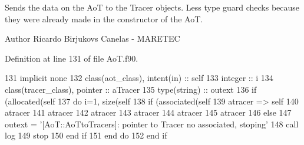 Sends the data on the AoT to the Tracer objects. Less type guard checks because they were already made in the constructor of the AoT. 

\begin{DoxyAuthor}{Author}
Ricardo Birjukovs Canelas -\/ M\+A\+R\+E\+T\+EC 
\end{DoxyAuthor}


Definition at line 131 of file Ao\+T.\+f90.


\begin{DoxyCode}
131     \textcolor{keywordtype}{implicit none}
132     \textcolor{keywordtype}{class}(aot\_class), \textcolor{keywordtype}{intent(in)} :: self
133     \textcolor{keywordtype}{integer} :: i
134     \textcolor{keywordtype}{class}(tracer\_class), \textcolor{keywordtype}{pointer} :: aTracer
135     \textcolor{keywordtype}{type}(string) :: outext
136     \textcolor{keywordflow}{if} (\textcolor{keyword}{allocated}(self%
137         \textcolor{keywordflow}{do} i=1, \textcolor{keyword}{size}(self%
138             \textcolor{keywordflow}{if} (\textcolor{keyword}{associated}(self%
139                 atracer => self%
140                 atracer%
141                 atracer%
142                 atracer%
143                 atracer%
144                 atracer%
145                 atracer%
146             \textcolor{keywordflow}{else}
147                 outext = \textcolor{stringliteral}{'[AoT::AoTtoTracers]: pointer to Tracer no associated, stoping'}
148                 \textcolor{keyword}{call }log%
149                 stop
150 \textcolor{keywordflow}{            end if}
151 \textcolor{keywordflow}{        end do}
152 \textcolor{keywordflow}{    end if}    
\end{DoxyCode}

